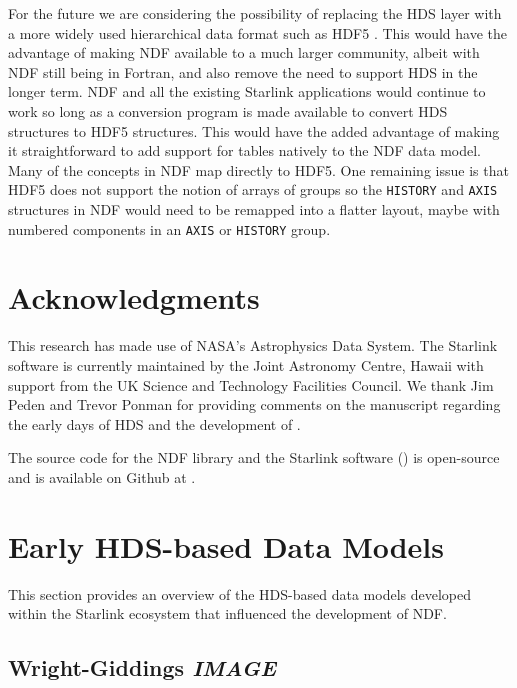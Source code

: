 \documentclass[final,authoryear,5p,times,twocolumn]{elsarticle}
\begin{document}
For the future we are considering the possibility of replacing the HDS
layer with a more widely used hierarchical data format such as HDF5
\citep{Folk:2011:OHT:1966895.1966900}. This would have the advantage
of making NDF available to a much larger community, albeit with NDF
still being in Fortran, and also remove the
need to support HDS in the longer term. NDF and all the existing
Starlink applications would continue to work so long as a conversion
program is made available to convert HDS structures to HDF5 structures.
This would have the added advantage of making it straightforward to
add support for tables natively to the NDF data model. Many of the
concepts in NDF map directly to HDF5. One remaining issue is that HDF5
does not support the notion of arrays of groups so the
\texttt{HISTORY} and \texttt{AXIS} structures in NDF would need to be
remapped into a flatter layout, maybe with numbered components in an
\texttt{AXIS} or \texttt{HISTORY} group.

\section{Acknowledgments}

This research has made use of NASA's Astrophysics Data System.
The Starlink software is currently maintained by the Joint Astronomy
Centre, Hawaii with support from the UK Science and Technology
Facilities Council. We thank Jim Peden and Trevor Ponman for providing
comments on the manuscript regarding the early days of HDS and the
development of \asterix.

The source code for the NDF library and the Starlink software
() is open-source and is available on Github at
.


\appendix

\section{Early HDS-based Data Models}
\label{app:chaos}

This section provides an overview of the HDS-based data models
developed within the Starlink ecosystem that influenced the
development of NDF.

\subsection{Wright-Giddings \emph{IMAGE}}
\label{app:image}
\end{document}

